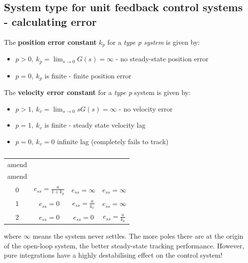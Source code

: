 \documentclass[class=report, crop=false, 12pt,a4paper]{standalone}
\begin{document}
\subsection{System type for unit feedback control systems - calculating error}
The \textbf{position error constant} $k_p$ for a \textit{type p system} is given by: 
\begin{itemize}
  \item $p > 0, \ k_p = \lim_{s\rightarrow 0} G(s) = \infty$ - no steady-state position error
  \item $p=0, \ k_p$ is finite - finite position error
\end{itemize}
The \textbf{velocity error constant} for a \textit{type p} system is given by:
\begin{itemize}
  \item $p> 1, \ k_v = \lim_{s\rightarrow 0} sG(s) = \infty$ - no velocity error
  \item $p = 1, \ k_v$ is finite - steady state velocity lag
  \item $p = 0, \ k_v = 0$ infinite lag (completely fails to track) 
\end{itemize}
\begin{table}[H]
  \begin{center}
  \begin{tabular}{|c|c|c|c|}
    \hline
    amend & & &\\
    amend & & &\\
    \hline
    \hline
    0 & $e_{ss} = \frac{a}{1+k_p}$ & $e_{ss} = \infty$ & $e_{ss} = \infty$\\
    \hline
    1 & $e_{ss} = 0$ & $e_{ss} = \frac{a}{k_v}$ & $e_{ss} = \infty$\\
    \hline
    2 & $e_{ss} = 0$ & $e_{ss} = 0$ & $e_{ss} = \frac{a}{k_a}$\\
    \hline
  \end{tabular}
  \end{center}
  \caption{}
\end{table}
where $\infty$ means the system never settles. The more poles there are at the origin of the open-loop system, the better steady-state tracking performance. However, pure integrations have a highly destabilising effect on the control system!
\end{document}

